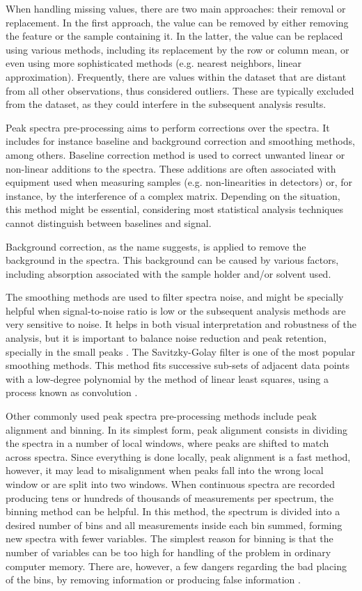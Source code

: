 When handling missing values, there are two main approaches: their removal or replacement. In the first approach, the value can be removed by either removing the feature or the sample containing it. In the latter, the value can be replaced using various methods, including its replacement by the row or column mean, or even using more sophisticated methods (e.g. nearest neighbors, linear approximation). Frequently, there are values within the dataset that are distant from all other observations, thus considered outliers. These are typically excluded from the dataset, as they could interfere in the subsequent analysis results.

Peak spectra pre-processing aims to perform corrections over the spectra. It includes for instance baseline and background correction and smoothing methods, among others. Baseline correction method is used to correct unwanted linear or non-linear additions to the spectra. These additions are often associated with equipment used when measuring samples (e.g. non-linearities in detectors) or, for instance, by the interference of a complex matrix. Depending on the situation, this method might be essential, considering most statistical analysis techniques cannot distinguish between baselines and signal. 

Background correction, as the name suggests, is applied to remove the background in the spectra. This background can be caused by various factors, including absorption associated with the sample holder and/or solvent used. 

The smoothing methods are used to filter spectra noise, and might be specially helpful when signal-to-noise ratio is low or the subsequent analysis methods are very sensitive to noise. It helps in both visual interpretation and robustness of the analysis, but it is important to balance noise reduction and peak retention, specially in the small peaks \citep{liland2011multivariate}. The Savitzky-Golay filter is one of the most popular smoothing methods. This method fits successive sub-sets of adjacent data points with a low-degree polynomial by the method of linear least squares, using a process known as convolution \citep{savitzky1964smoothing}.

Other commonly used peak spectra pre-processing methods include peak alignment and binning. In its simplest form, peak alignment consists in dividing the spectra in a number of local windows, where peaks are shifted to match across spectra. Since everything is done locally, peak alignment is a fast method, however, it may lead to misalignment when peaks fall into the wrong local window or are split into two windows. When continuous spectra are recorded producing tens or hundreds of thousands of measurements per spectrum, the binning method can be helpful. In this method, the spectrum is divided into a desired number of bins and all measurements inside each bin summed, forming new spectra with fewer variables. The simplest reason for binning is that the number of variables can be too high for handling of the problem in ordinary computer memory. There are, however, a few dangers regarding the bad placing of the bins, by removing information or producing false information \citep{liland2011multivariate}.


